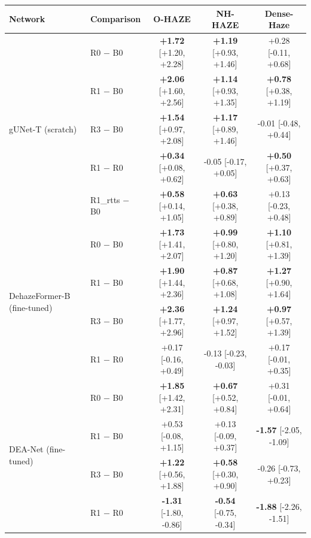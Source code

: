 \begin{tabular}{llccc}
\toprule
Network & Comparison & O-HAZE & NH-HAZE & Dense-Haze \\
\midrule
\multirow{5}{*}{gUNet-T (scratch)} & R0 $-$ B0 & \textbf{+1.72} {\scriptsize[+1.20, +2.28]} & \textbf{+1.19} {\scriptsize[+0.93, +1.46]} & +0.28 {\scriptsize[-0.11, +0.68]} \\
 & R1 $-$ B0 & \textbf{+2.06} {\scriptsize[+1.60, +2.56]} & \textbf{+1.14} {\scriptsize[+0.93, +1.35]} & \textbf{+0.78} {\scriptsize[+0.38, +1.19]} \\
 & R3 $-$ B0 & \textbf{+1.54} {\scriptsize[+0.97, +2.08]} & \textbf{+1.17} {\scriptsize[+0.89, +1.46]} & -0.01 {\scriptsize[-0.48, +0.44]} \\
 & R1 $-$ R0 & \textbf{+0.34} {\scriptsize[+0.08, +0.62]} & -0.05 {\scriptsize[-0.17, +0.05]} & \textbf{+0.50} {\scriptsize[+0.37, +0.63]} \\
 & R1\_rtts $-$ B0 & \textbf{+0.58} {\scriptsize[+0.14, +1.05]} & \textbf{+0.63} {\scriptsize[+0.38, +0.89]} & +0.13 {\scriptsize[-0.23, +0.48]} \\
\midrule
\multirow{4}{*}{DehazeFormer-B (fine-tuned)} & R0 $-$ B0 & \textbf{+1.73} {\scriptsize[+1.41, +2.07]} & \textbf{+0.99} {\scriptsize[+0.80, +1.20]} & \textbf{+1.10} {\scriptsize[+0.81, +1.39]} \\
 & R1 $-$ B0 & \textbf{+1.90} {\scriptsize[+1.44, +2.36]} & \textbf{+0.87} {\scriptsize[+0.68, +1.08]} & \textbf{+1.27} {\scriptsize[+0.90, +1.64]} \\
 & R3 $-$ B0 & \textbf{+2.36} {\scriptsize[+1.77, +2.96]} & \textbf{+1.24} {\scriptsize[+0.97, +1.52]} & \textbf{+0.97} {\scriptsize[+0.57, +1.39]} \\
 & R1 $-$ R0 & +0.17 {\scriptsize[-0.16, +0.49]} & -0.13 {\scriptsize[-0.23, -0.03]} & +0.17 {\scriptsize[-0.01, +0.35]} \\
\midrule
\multirow{4}{*}{DEA-Net (fine-tuned)} & R0 $-$ B0 & \textbf{+1.85} {\scriptsize[+1.42, +2.31]} & \textbf{+0.67} {\scriptsize[+0.52, +0.84]} & +0.31 {\scriptsize[-0.01, +0.64]} \\
 & R1 $-$ B0 & +0.53 {\scriptsize[-0.08, +1.15]} & +0.13 {\scriptsize[-0.09, +0.37]} & \textbf{-1.57} {\scriptsize[-2.05, -1.09]} \\
 & R3 $-$ B0 & \textbf{+1.22} {\scriptsize[+0.56, +1.88]} & \textbf{+0.58} {\scriptsize[+0.30, +0.90]} & -0.26 {\scriptsize[-0.73, +0.23]} \\
 & R1 $-$ R0 & \textbf{-1.31} {\scriptsize[-1.80, -0.86]} & \textbf{-0.54} {\scriptsize[-0.75, -0.34]} & \textbf{-1.88} {\scriptsize[-2.26, -1.51]} \\
\bottomrule
\end{tabular}